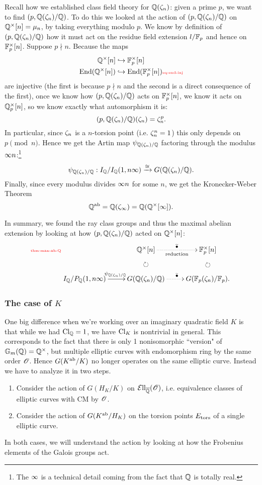 Recall how we established class field theory for $\mathbb{Q}(\zeta_n)$: given a prime $p$, we want to find $(p,\mathbb{Q}(\zeta_n)/\mathbb{Q})$. To do this we looked at the action of $(p,\mathbb{Q}(\zeta_n)/\mathbb{Q})$ on $\mathbb{Q}^{\times}[n]=\mu_n$, by taking everything modulo $p$. We know by definition of $(p,\mathbb{Q}(\zeta_n)/\mathbb{Q})$ how it must act on the residue field extension $l/\mathbb{F}_p$ and hence on $\mathbb{F}_p^{\times}[n]$. Suppose $p\nmid n$. Because the maps
\begin{align}
\nonumber\Q^{\times}[n]&\hra \F_p^{\times}[n]\\
\End(\Q^{\times}[n])&\hra  \End(\F_p^{\times}[n])\llabel{eq:end-inj}
\end{align}
are injective (the first is because $p\nmid n$ and the second is a direct consequence of the first), once we know how $(p,\mathbb{Q}(\zeta_n)/\mathbb{Q})$ acts on $\mathbb{F}_p^{\times}[n]$, we know it acts on $\mathbb{Q}_p^{\times}[n]$, so we know exactly what automorphism it is:
\[
(p,\mathbb{Q}(\zeta_n)/\mathbb{Q})(\zeta_n)=\zeta_n^p.
\]
In particular, since $\zeta_n$ is a $n$-torsion point (i.e. $\zeta_n^n=1$) this only depends on $p\pmod n$. Hence we get the Artin map $\psi_{\mathbb{Q}(\zeta_n)/\mathbb{Q}}$ factoring through the modulus $\infty n$:\footnote{The $\infty$ is a technical detail coming from the fact that $\mathbb{Q}$ is totally real.}
\[
\psi_{\mathbb{Q}(\zeta_n)/\mathbb{Q}}:I_{\mathbb{Q}}/I_{\mathbb{Q}}(1,n\infty)\xrightarrow{\cong} G(\mathbb{Q}(\zeta_n)/\mathbb{Q}).
\]
Finally, since every modulus divides $\infty n$ for some $n$, we get the Kronecker-Weber Theorem
\[
\mathbb{Q}^{\text{ab}}=\mathbb{Q}(\zeta_{\infty})=\mathbb{Q}(\mathbb{Q}^{\times}[\infty]).
\]

In summary, we found the ray class groups and thus the maximal abelian extension by looking at how $(p,\mathbb{Q}(\zeta_n)/\mathbb{Q})$ acted on $\mathbb{Q}^{\times}[n]$:
\begin{equation}\llabel{thm:max-ab-Q}
\xymatrix{
&\Q^{\times}[n] \ar@{.>}[r]^{\wt{\bullet}}_{\text{reduction}}
\ar@{}[d]|-{\textstyle{\cir}} & \F_p^{\times}[n]\ar@{}[d]|-{\textstyle\cir}\\
I_{\Q}/P_{\Q}(1,n\iy)\ar[r]^{\psi_{\Q(\ze_n)/\Q}} & G(\Q(\ze_n)/\Q)\ar@{.>}[r]^{\wt{\bullet}} & G(\F_p(\ze_n)/\F_p).
}
\end{equation}
\subsubsection{The case of $K$}
One big difference when we're working over an imaginary quadratic field $K$ is that while we had $\operatorname{Cl}_{\mathbb{Q}}=1$, we have $\operatorname{Cl}_K$ is nontrivial in general. This corresponds to the fact that there is only 1 nonisomorphic ``version" of $\mathbb{G}_m(\mathbb{Q})=\mathbb{Q}^{\times}$, but multiple elliptic curves with endomorphism ring by the same order $\mathscr{O}$. Hence $G(K^{\text{ab}} /K)$ no longer operates on the same elliptic curve. Instead we have to analyze it in two steps.
\begin{enumerate}
\item
Consider the action of $G(H_K/K)$ on $\mathcal{E}{\rm{ll}}_{\overline{\mathbb{Q}}}(\mathscr{O})$, i.e. equivalence classes of elliptic curves with CM by $\mathscr{O}$.
\item
Consider the action of $G(K^{\text{ab}}/H_K)$ on the torsion points $E_{\text{tors}}$ of a single elliptic curve. 
\end{enumerate}
In both cases, we will understand the action by looking at how the Frobenius elements of the Galois groups act.

